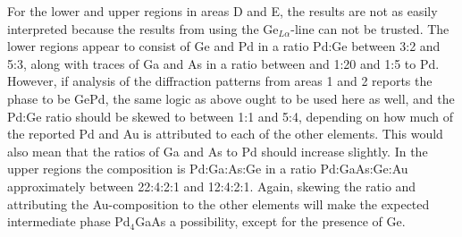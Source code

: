 For the lower and upper regions in areas D and E, the results are not as easily interpreted because the results from using the Ge$_{L\alpha}$-line can not be trusted. The lower regions appear to consist of Ge and Pd in a ratio Pd:Ge between 3:2 and 5:3, along with traces of Ga and As in a ratio between and 1:20 and 1:5 to Pd. However, if analysis of the diffraction patterns from areas 1 and 2 reports the phase to be GePd, the same logic as above ought to be used here as well, and the Pd:Ge ratio should be skewed to between 1:1 and 5:4, depending on how much of the reported Pd and Au is attributed to each of the other elements. This would also mean that the ratios of Ga and As to Pd should increase slightly.
In the upper regions the composition is Pd:Ga:As:Ge in a ratio Pd:GaAs:Ge:Au approximately between 22:4:2:1 and 12:4:2:1. Again, skewing the ratio and attributing the Au-composition to the other elements will make the expected intermediate phase Pd$_4$GaAs a possibility, except for the presence of Ge. 
